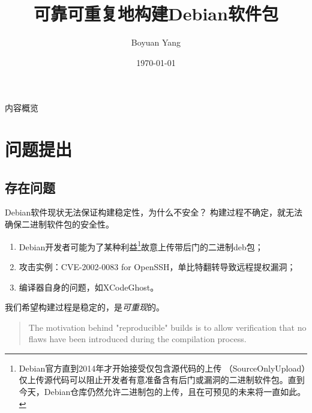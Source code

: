 \documentclass{beamer}
\title[Reproducible Builds in Debian]{可靠可重复地构建Debian软件包}
\author[hosiet]{Boyuan Yang}
\institute[LUG@USTC]{USTC Linux User Group}
\date{\today}
\begin{document}
\begin{frame}
\titlepage
\end{frame}
\begin{frame}{内容概览}
\tableofcontents
\end{frame}



\section{问题提出}
\subsection{存在问题}
\begin{frame}{Debian软件现状}{无法保证构建稳定性，为什么不安全？}
构建过程不确定，就无法确保二进制软件包的安全性。

\begin{enumerate}
\item Debian开发者可能为了某种利益\footnote{Debian官方直到2014年才开始接受仅包含源代码的上传
（SourceOnlyUpload）仅上传源代码可以阻止开发者有意准备含有后门或漏洞的二进制软件包。直到
今天，Debian仓库仍然允许二进制包的上传，且在可预见的未来将一直如此。\cite{debianwikisou}}故意上传带后门的二进制deb包；
\item 攻击实例：CVE-2002-0083 for OpenSSH，单比特翻转导致远程提权漏洞；
\item 编译器自身的问题，如XCodeGhost。
\end{enumerate}
\pause

我们希望构建过程是稳定的，是\emph{可重现}的。
\vfill

\begin{quotation}
The motivation behind "reproducible" builds is to allow verification that no flaws have been introduced during the compilation process.\cite{minidebconf20161113}
\end{quotation}
\end{frame}
\end{document}
